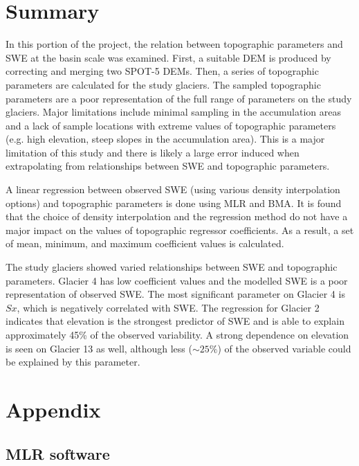 \documentclass[12pt]{article}
\begin{document}

\section{Summary}

In this portion of the project, the relation between topographic parameters and SWE at the basin scale was examined. First, a suitable DEM is produced by correcting and merging two SPOT-5 DEMs. Then, a series of topographic parameters are calculated for the study glaciers. The sampled topographic parameters are a poor representation of the full range of parameters on the study glaciers. Major limitations include minimal sampling in the accumulation areas and a lack of sample locations with extreme values of topographic parameters (e.g. high elevation, steep slopes in the accumulation area). This is a major limitation of this study and there is likely a large error induced when extrapolating from relationships between SWE and topographic parameters. 

A linear regression between observed SWE (using various density interpolation options) and topographic parameters is done using MLR and BMA. It is found that the choice of density interpolation and the regression method do not have a major impact on the values of topographic regressor coefficients. As a result, a set of mean, minimum, and maximum coefficient values is calculated. 

The study glaciers showed varied relationships between SWE and topographic parameters. Glacier 4 has low coefficient values and the modelled SWE is a poor representation of observed SWE. The most significant parameter on Glacier 4 is $Sx$, which is negatively correlated with SWE. The regression for Glacier 2 indicates that elevation is the strongest predictor of SWE and is able to explain approximately 45\% of the observed variability.  A strong dependence on elevation is seen on Glacier 13 as well, although less ($\sim25\%$) of the observed variable could be explained by this parameter. 

 

\section{Appendix}

	\subsection{MLR software}
\label{sec:MLRMethods}
\end{document}

